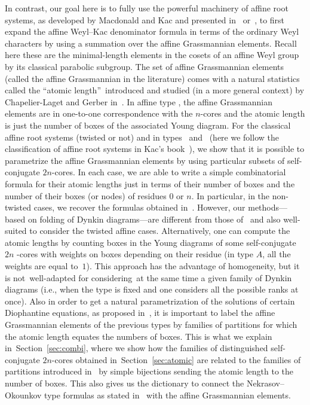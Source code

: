 \documentclass[10pt,a4paper]{amsart}
\numberwithin{equation}{section}
\begin{document}
In contrast, our goal here is to fully use the powerful machinery of
affine root systems, as developed by Macdonald and Kac and presented in~\cite{carter_affine,Mac}
or~\cite{KacB}, to first expand the affine Weyl--Kac denominator formula in
terms of the ordinary Weyl characters by using a summation over the
affine Grassmannian elements. Recall here these are the minimal-length
elements in the cosets of an affine Weyl group by its classical parabolic
subgroup. The set of affine Grassmannian elements (called the affine
Grassmannian in the literature) comes with a natural statistics called the
\textquotedblleft atomic length\textquotedblright\ introduced and studied
(in a more general context) by Chapelier-Laget and Gerber in~\cite{CGT}. In
affine type , the affine Grassmannian elements are in
one-to-one correspondence with the $n$-cores and the atomic length is just
the number of boxes of the associated Young diagram. For the classical
affine root systems (twisted or not) and in types~ and~
(here we follow the classification of affine root systems in
Kac's book~\cite{KacB}), we show that it is possible to parametrize the
affine Grassmannian elements by using particular subsets of self-conjugate $2n
$-cores. In each case, we are able to write a simple combinatorial formula
for their atomic lengths just in terms of their number of boxes and the
number of their boxes (or nodes) of residues $0$ or $n$. In particular, in
the non-twisted cases, we recover the formulas obtained in~\cite{STW}.
However, our methods---based on folding of Dynkin diagrams---are different from those of~\cite{STW} and also well-suited to
consider the twisted affine cases. Alternatively, one can compute the atomic
lengths by counting boxes in the Young diagrams of some self-conjugate $2n$%
-cores with weights on boxes depending on their residue (in type $A$, all
the weights are equal to~$1$). This approach has the advantage of
homogeneity, but it is not~well-adapted for considering~at the same time a
given family  of Dynkin diagrams (i.e., when the
type is fixed and one considers all the possible ranks at once). Also in
order to get a natural parametrization of the solutions of certain Diophantine
equations, as proposed in~\cite{BCT}, it is important to label the affine
Grassmannian elements of the previous types by families of partitions for
which the atomic length equates the numbers of boxes. This is what we
explain in~Section~\ref{sec:combi}, where we show how the families of distinguished
self-conjugate $2n$-cores obtained in~Section~\ref{sec:atomic} are related to the families
of partitions introduced in~\cite{Wmac} by simple bijections sending the atomic length to the number of boxes. This also gives us the dictionary to connect the Nekrasov--Okounkov type formulas as stated in~\cite{Wmac} with the affine Grassmannian elements.
\end{document}
